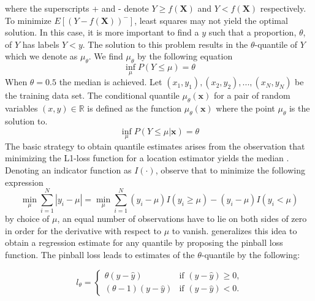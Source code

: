 \documentclass[twoside,11pt]{article}
\begin{document}
where the superscripts + and - denote $Y \geq f(\mathbf{X})$ and $Y < f(\mathbf{X})$ respectively. To minimize $E[(Y-f(\mathbf{X}))^-]$, least squares may not yield the optimal solution. In this case, it is more important to find a $y$ such that a proportion, $\theta$, of $Y$ has labels $Y<y$. The solution to this problem results in the $\theta$-quantile of $Y$ which we denote as $\mu_{\theta}$. We find $\mu_{\theta}$ by the following equation
 \begin{equation}
 \inf_{\mu}P(Y\leq \mu)=\theta
 \end{equation}
When $\theta = 0.5$ the median is achieved. Let $(x_1,y_1),(x_2,y_2),...,(x_N,y_N)$ be the training data set. The conditional quantile $\mu_{\theta}(\mathbf{x})$ for a pair of random variables $(x,y) \in \mathbb{R}$ is defined as the function $\mu_{\theta}(\mathbf{x}) $ where the point $\mu_{\theta}$ is the solution to.
 \begin{equation}
 \inf_{\mu}P(Y\leq \mu|\mathbf{x})=\theta
 \end{equation}
The basic strategy to obtain quantile estimates arises from the observation that minimizing the L1-loss function for a location estimator yields the median \citep{Hao07}. Denoting an indicator function as $I(\cdot)$, observe that to minimize the following expression
\begin{equation}\label{Eq:median minimize}
\min_{\mu}\sum_{i=1}^{N}|y_i-\mu|=\min_{\mu}\sum_{i=1}^{N}(y_i-\mu)I(y_i \geq \mu) - (y_i-\mu)I(y_i < \mu) 
 \end{equation}
by choice of $\mu$, an equal number of observations have to lie on both sides of zero in order for the derivative with respect to $\mu$ to vanish. \citet{Koenker01} generalizes this idea to obtain a regression estimate for any quantile by proposing the pinball loss function. The pinball loss leads to estimates of the $\theta$-quantile by the following:

\begin{equation}\label{Eq:pinball}
l_{\theta}=
\begin{cases} \theta (y-\hat{y}) & \text{if $(y-\hat{y})\geq 0$,}
\\
 (\theta - 1) (y-\hat{y})  &\text{if $(y-\hat{y})< 0$.}
\end{cases}
\end{equation}
\end{document}
